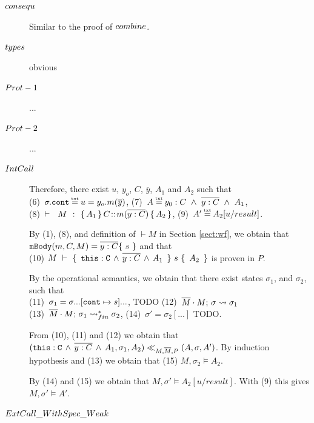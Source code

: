 \begin{description}
\item[${\sc{consequ}}$] Similar to the proof of  ${\sc{combine}}$. 

\item[${\sc{types}}$] obvious

\item[${\sc{Prot-1}}$] ...

\item[${\sc{Prot-2}}$] ...

\item[${\sc{IntCall}}$]

Therefore, there exist $u$, $y_o$, $C$, $\overline y$,  $A_1$ and $A_2$ such that \\
(6)\ $\sigma.\prg{cont}\txteq u=y_o.m(\overline y)$,  \hspace{2cm}
 (7)\ $A \txteq y_0:C  \ \wedge\ \overline {y:C}\ \wedge \ A_1$, 
\\
 (8)\ ${\vdash \ \ M\ \ \mathbf{:}\ \  \{\, A_1\, \}\, C\!::\!m(\overline{y:C})\, \{\, A_2\, \}  }$,   \hspace{1cm}
 (9)\ $A' \txteq  A_2[ u/result]$. 

By (1), (8), and definition of $\vdash M$ in Section \ref{sect:wf}, we obtain that   $\prg{mBody}(m,C,M)=\overline{y:C}\{\  s \ \}$ and that\\
(10)   ${M\ \vdash\ \{\, \ \mbox{\normalfont{\texttt{this}}}:\mbox{\normalfont{\texttt{C}}}\, \wedge\, \overline{y:C}\, \wedge\, A_1\  \, \} \ s\  \{\,\ A_2\ \, \} }$ is proven in $P$.
 
 By the operational semantics, we obtain that there exist states $\sigma_1$, and $\sigma_2$, such that \\
 (11)\ $\sigma_1=\sigma ...[\mbox{\normalfont{\texttt{cont}}}\mapsto s]... $, TODO   \hspace{1cm}
   (12)\ $\overline{M}\cdot M;\, {\sigma} \rightsquigarrow \sigma_1$ \\
 (13)\ $\overline{M}\cdot M;\, {\sigma_1} \rightsquigarrow^*_{fin} \sigma_2$,   \hspace{1cm}
 (14)\ $\sigma'=\sigma_2[...]$ TODO.
 
 From (10), (11) and (12) we obtain that $( \mbox{\normalfont{\texttt{this}}}:\mbox{\normalfont{\texttt{C}}}\, \wedge\, \overline{y:C}\, \wedge\, A_1,\sigma_1,A_2) \ll_{M,\overline{M},P} (A,\sigma,A')$. By induction hypothesis and (13) we obtain that (15) $M,\sigma_2 \models A_2$.
 
 By (14) and  (15) we obtain that $M,\sigma' \models A_2[ u/result]$. With (9) this gives $M,\sigma' \models A'$.

\item[${\sc{ExtCall\_WithSpec\_Weak}}$]


\end{description}
